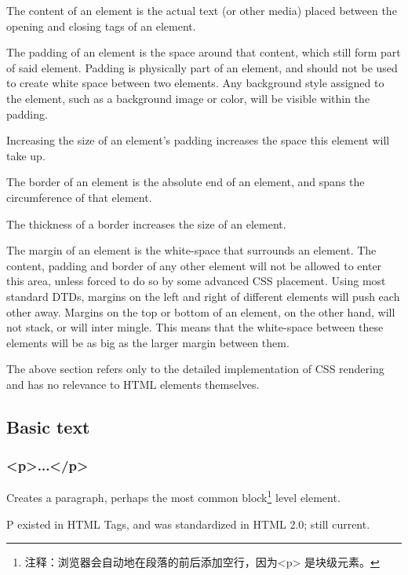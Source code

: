 \begin{compactitem}
\item The content of an element is the actual text (or other media) placed between the opening and closing tags of an element.
\item The padding of an element is the space around that content, which still form part of said element. Padding is physically part of an element, and should not be used to create white space between two elements. Any background style assigned to the element, such as a background image or color, will be visible within the padding. 
\item Increasing the size of an element's padding increases the space this element will take up.
\item The border of an element is the absolute end of an element, and spans the circumference of that element. \item The thickness of a border increases the size of an element.
\item The margin of an element is the white-space that surrounds an element. The content, padding and border of any other element will not be allowed to enter this area, unless forced to do so by some advanced CSS placement. Using most standard DTDs, margins on the left and right of different elements will push each other away. Margins on the top or bottom of an element, on the other hand, will not stack, or will inter mingle. This means that the white-space between these elements will be as big as the larger margin between them.
\end{compactitem}

The above section refers only to the detailed implementation of CSS rendering and has no relevance to HTML elements themselves.



\subsection{Basic text}



\subsubsection{<p>...</p>}

Creates a paragraph, perhaps the most common block\footnote{注释：浏览器会自动地在段落的前后添加空行，因为<p> 是块级元素。} level element.

P existed in HTML Tags, and was standardized in HTML 2.0; still current.

